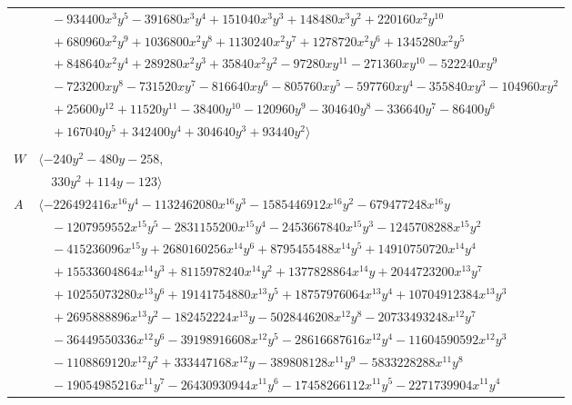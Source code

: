 \documentclass[11pt]{article}
\begin{document}
\begin{longtable}{@{}ll@{}}
 & $\quad -934400x^{3}y^{5}-391680x^{3}y^{4}+151040x^{3}y^{3}+148480x^{3}y^{2}+220160x^{2}y^{10}$\\
 & $\quad +680960x^{2}y^{9}+1036800x^{2}y^{8}+1130240x^{2}y^{7}+1278720x^{2}y^{6}+1345280x^{2}y^{5}$\\
 & $\quad +848640x^{2}y^{4}+289280x^{2}y^{3}+35840x^{2}y^{2}-97280xy^{11}-271360xy^{10}-522240xy^{9}$\\
 & $\quad -723200xy^{8}-731520xy^{7}-816640xy^{6}-805760xy^{5}-597760xy^{4}-355840xy^{3}-104960xy^{2}$\\
 & $\quad +25600y^{12}+11520y^{11}-38400y^{10}-120960y^{9}-304640y^{8}-336640y^{7}-86400y^{6}$\\
 & $\quad +167040y^{5}+342400y^{4}+304640y^{3}+93440y^{2}\rangle$\\
\addlinespace[2pt]
\multicolumn{2}{@{}p{0.97\textwidth}@{}}{$i=45$, $D_i=64$, $\rho_{ij}$: $0{:}1, \allowbreak 2{:}1, \allowbreak 4{:}2, \allowbreak 6{:}2, \allowbreak 10{:}1, \allowbreak 11{:}2, \allowbreak 14{:}1, \allowbreak 16{:}1, \allowbreak 33{:}2, \allowbreak 37{:}2, \allowbreak 39{:}2, \allowbreak 54{:}2, \allowbreak 59{:}1, \allowbreak 60{:}2$}\\
$W$ & $\langle -240y^{2}-480y-258,$\\
 & $\quad 330y^{2}+114y-123\rangle$\\
$A$ & $\langle -226492416x^{16}y^{4}-1132462080x^{16}y^{3}-1585446912x^{16}y^{2}-679477248x^{16}y$\\
 & $\quad -1207959552x^{15}y^{5}-2831155200x^{15}y^{4}-2453667840x^{15}y^{3}-1245708288x^{15}y^{2}$\\
 & $\quad -415236096x^{15}y+2680160256x^{14}y^{6}+8795455488x^{14}y^{5}+14910750720x^{14}y^{4}$\\
 & $\quad +15533604864x^{14}y^{3}+8115978240x^{14}y^{2}+1377828864x^{14}y+2044723200x^{13}y^{7}$\\
 & $\quad +10255073280x^{13}y^{6}+19141754880x^{13}y^{5}+18757976064x^{13}y^{4}+10704912384x^{13}y^{3}$\\
 & $\quad +2695888896x^{13}y^{2}-182452224x^{13}y-5028446208x^{12}y^{8}-20733493248x^{12}y^{7}$\\
 & $\quad -36449550336x^{12}y^{6}-39198916608x^{12}y^{5}-28616687616x^{12}y^{4}-11604590592x^{12}y^{3}$\\
 & $\quad -1108869120x^{12}y^{2}+333447168x^{12}y-389808128x^{11}y^{9}-5833228288x^{11}y^{8}$\\
 & $\quad -19054985216x^{11}y^{7}-26430930944x^{11}y^{6}-17458266112x^{11}y^{5}-2271739904x^{11}y^{4}$\\

\end{longtable}
\end{document}
